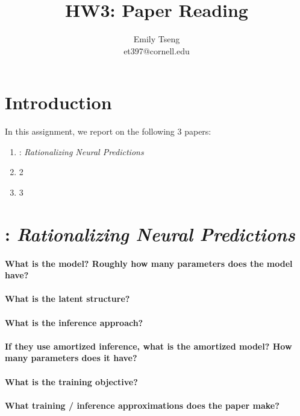 \documentclass[11pt]{article}
\title{HW3: Paper Reading}
\author{Emily Tseng \\ et397@cornell.edu }
\begin{document}
\maketitle{}
\section{Introduction}

In this assignment, we report on the following 3 papers:
\begin{enumerate}
  \item \cite{lei2016rationalizing}: \textit{Rationalizing Neural Predictions}
  \item 2
  \item 3
\end{enumerate}

\section{\cite{lei2016rationalizing}: \textit{Rationalizing Neural Predictions}}

\paragraph{What is the model? Roughly how many parameters does the model have?}

\paragraph{What is the latent structure?}

\paragraph{What is the inference approach?}

\paragraph{If they use amortized inference, what is the amortized model? How many parameters does it have?}

\paragraph{What is the training objective?}

\paragraph{What training / inference approximations does the paper make?}
\end{document}
